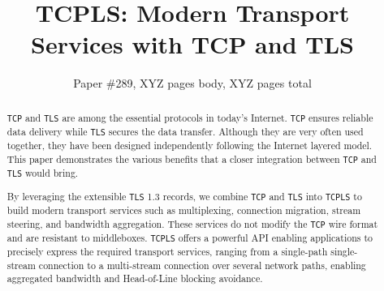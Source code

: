 \documentclass[10pt,sigconf,letterpaper,anonymous,nonacm]{acmart}
\newcommand{\tcpls}{\texttt{TCPLS}\xspace}
\newcommand{\tcp}{\texttt{TCP}\xspace}
\newcommand{\mptcp}{\texttt{MPTCP}\xspace}
\newcommand{\tls}{\texttt{TLS}\xspace}
\newcommand{\quic}{\texttt{QUIC}\xspace}
\begin{document}
\title{TCPLS: Modern Transport Services with TCP and TLS}

\author{Paper \#289, XYZ pages body, XYZ pages total}

\renewcommand{\shortauthors}{X.et al.}


\begin{abstract}
  \tcp and \tls are among the essential protocols in today's Internet. \tcp
  ensures reliable data delivery while \tls secures the data transfer.
  Although they are very often used together, they have been designed 
  independently following the Internet layered model.
  This paper %
  demonstrates the various benefits that a closer integration between \tcp and 
  \tls would bring.

  By leveraging the extensible \tls 1.3 records, we combine \tcp and \tls into
  \tcpls to build modern transport services such as multiplexing, connection 
  migration, stream steering, and bandwidth aggregation. These services do not 
  modify the \tcp wire format and are resistant to middleboxes. \tcpls offers a 
  powerful API enabling applications to precisely express the required 
  transport services, ranging from a single-path single-stream connection to a 
  multi-stream connection over several network paths, enabling aggregated 
  bandwidth and Head-of-Line blocking avoidance.



\end{abstract}
\end{document}
